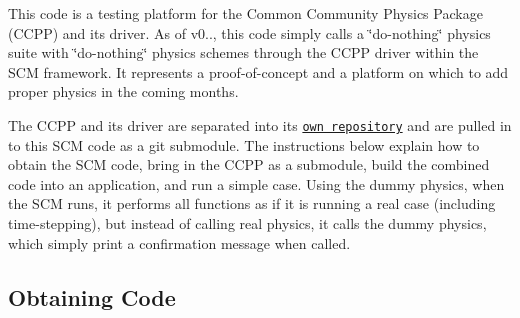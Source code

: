 This code is a testing platform for the Common Community Physics Package (C\+C\+PP) and its driver. As of v0.., this code simply calls a \char`\"{}do-\/nothing\char`\"{} physics suite with \char`\"{}do-\/nothing\char`\"{} physics schemes through the C\+C\+PP driver within the S\+CM framework. It represents a proof-\/of-\/concept and a platform on which to add proper physics in the coming months.

The C\+C\+PP and its driver are separated into its \href{https://github.com/NCAR/gmtb-ccpp}{\tt own repository} and are pulled in to this S\+CM code as a git submodule. The instructions below explain how to obtain the S\+CM code, bring in the C\+C\+PP as a submodule, build the combined code into an application, and run a simple case. Using the dummy physics, when the S\+CM runs, it performs all functions as if it is running a real case (including time-\/stepping), but instead of calling real physics, it calls the dummy physics, which simply print a confirmation message when called.

\subsection*{Obtaining Code}


